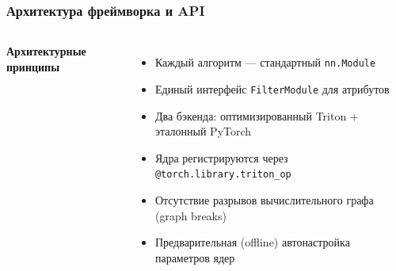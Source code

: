 \documentclass[aspectratio=169,9pt]{beamer}
\begin{document}
\begin{frame}
\frametitle{Архитектура фреймворка и API}

\begin{columns}[T]
  \textbf{Архитектурные принципы}
  \begin{itemize}\footnotesize
    \item Каждый алгоритм --- стандартный \texttt{nn.Module}
    \item Единый интерфейс \texttt{FilterModule} для атрибутов
    \item Два бэкенда: оптимизированный Triton + эталонный PyTorch
    \item Ядра регистрируются через \texttt{@torch.library.triton\_op}
    \item Отсутствие разрывов вычислительного графа (graph breaks)
    \item Предварительная (offline) автонастройка параметров ядер
  \end{itemize}


\end{columns}
\end{frame}
\end{document}

